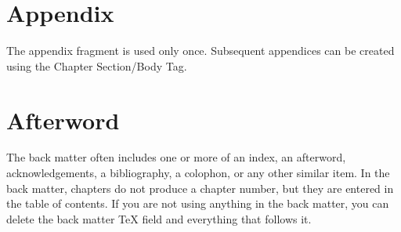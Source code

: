 \documentclass{book}
\begin{document}
%

\bigskip 

\appendix

\chapter{Appendix}

The appendix fragment is used only once. Subsequent appendices can be
created using the Chapter Section/Body Tag.

\backmatter

\chapter{Afterword}

The back matter often includes one or more of an index, an afterword,
acknowledgements, a bibliography, a colophon, or any other similar item. In
the back matter, chapters do not produce a chapter number, but they are
entered in the table of contents. If you are not using anything in the back
matter, you can delete the back matter TeX field and everything that follows
it.
\end{document}
